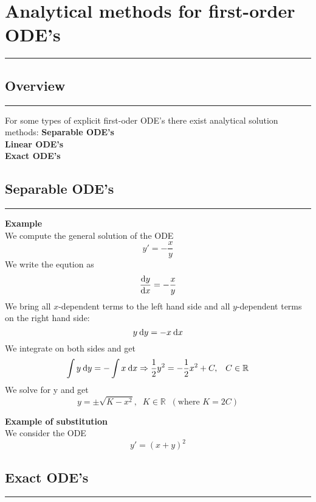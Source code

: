 \section{Analytical methods for first-order ODE’s}
\noindent\rule[\linienAbstand]{\linewidth}{\linienDickeDick}

\subsection{Overview}
\noindent\rule[\linienAbstand]{\linewidth}{\linienDicke}
For some types of explicit first-oder ODE’s there exist analytical solution methods:
\textbf{Separable ODE's}\\
\textbf{Linear ODE's}\\
\textbf{Exact ODE's}\\

\subsection{Separable ODE’s}
\noindent\rule[\linienAbstand]{\linewidth}{\linienDicke}
\textbf{Example}\\
We compute the general solution of the ODE
\begin{equation}
  y' = -\frac{x}{y}
\end{equation}
We write the eqution as
\begin{equation}
  \frac{\textup{d}y}{\textup{d}x} = -\frac{x}{y}
\end{equation}
We bring all $x$-dependent terms to the left hand side and all $y$-dependent terms on
the right hand side:
\begin{equation}
  y\:\textup{d}y = -x \:\textup{d}x
\end{equation}
We integrate on both sides and get
\begin{equation}
  \int y\:\textup{d}y = - \int x\:\textup{d}x \Rightarrow \frac{1}{2}y^2 = - \frac{1}{2} x^2 + C, \;\;\; C \in \mathbb{R}
\end{equation}
We solve for y and get
\begin{equation}
  y = \pm \sqrt{K - x^2}, \;\; K \in \mathbb{R}\;\; (\text{where } K = 2C)
\end{equation}

\textbf{Example of substitution}\\
We consider the ODE
\begin{equation}
  y' = (x + y)^2
\end{equation}


\subsection{Exact ODE’s}
\noindent\rule[\linienAbstand]{\linewidth}{\linienDicke}
